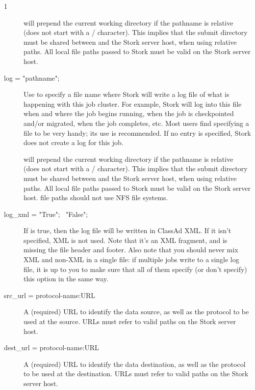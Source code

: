 \begin{ManPage}{\label{man-stork-submit}}{1}
\begin{description}
 will prepend the current working directory if the pathname is
relative (does not start with a / character).  This implies that the submit
directory must be shared between  and the Stork server host, when
using relative paths.  All local file paths passed to Stork must be valid on
the Stork server host.


\item[log = "\lt{}pathname\gt{}";]
Use  to specify a file name where
Stork will write a log file of what is happening with this job cluster.
For example, Stork will log into this file when and where the job
begins running, when the job is checkpointed and/or migrated, when the
job completes, etc. Most users find specifying a  file to be very
handy; its use is recommended. If no  entry is specified, 
Stork does not create a log for this job.

 will prepend the current working directory if the pathname is
relative (does not start with a / character).  This implies that the submit
directory must be shared between  and the Stork server host, when
using relative paths.  All local file paths passed to Stork must be valid on
the Stork server host.
 file paths should not use NFS file systems.

\item[log\_xml = "True"; \Bar{}\ "False";]
If  is true, 
then the log file will be written in ClassAd XML. If it isn't
specified, XML is not used. Note that it's an XML fragment, and is
missing the file header and footer. Also note that you should never
mix XML and non-XML in a single file: if multiple jobs write to a
single log file, it is up to you to make sure that all of them specify
(or don't specify) this option in the same way.
\item[src\_url = \lt{}protocol-name:URL\gt{}]
A (required) URL to identify the data source, 
as well as the protocol to be used at the source.
 URLs must refer to valid paths on the Stork server host.

\item[dest\_url = \lt{}protocol-name:URL\gt{}]
A (required) URL to identify the data destination, 
as well as the protocol to be used at the destination.
 URLs must refer to valid paths on the Stork server host.


\end{description}
\end{ManPage}

